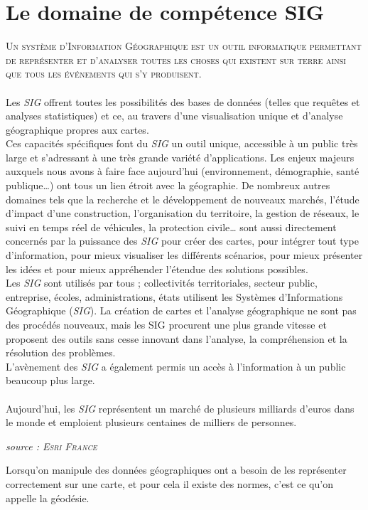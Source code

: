 \section{Le domaine de compétence SIG}
\textsc{
Un système d’Information Géographique est un outil informatique permettant de représenter et d’analyser toutes les choses qui existent sur terre ainsi que tous les événements qui s’y produisent.
}\\\\
Les \textit{SIG} offrent toutes les possibilités des bases de données (telles que requêtes et analyses statistiques) et ce, au travers d’une visualisation unique et d’analyse géographique propres aux cartes.
\\Ces capacités spécifiques font du \textit{SIG} un outil unique, accessible à un public très large et s’adressant à une très grande variété d’applications.
Les enjeux majeurs auxquels nous avons à faire face aujourd’hui (environnement, démographie, santé publique…) ont tous un lien étroit avec la géographie.
De nombreux autres domaines tels que la recherche et le développement de nouveaux marchés, l’étude d’impact d’une construction, l’organisation du territoire, la gestion de réseaux, le suivi en temps réel de véhicules, la protection civile… sont aussi directement concernés par la puissance des \textit{SIG} pour créer des cartes, pour intégrer tout type d’information, pour mieux visualiser les différents scénarios, pour mieux présenter les idées et pour mieux appréhender l’étendue des solutions possibles.
\\Les \textit{SIG} sont utilisés par tous ; collectivités territoriales, secteur public, entreprise, écoles, administrations, états utilisent les Systèmes d’Informations Géographique (\textit{SIG}). La création de cartes et l’analyse géographique ne sont pas des procédés nouveaux, mais les SIG procurent une plus grande vitesse et proposent des outils sans cesse innovant dans l’analyse, la compréhension et la résolution des problèmes.
\\L’avènement des \textit{SIG} a également permis un accès à l’information à un public beaucoup plus large.
\\\\
Aujourd’hui, les \textit{SIG} représentent un marché de plusieurs milliards d'euros dans le monde et emploient plusieurs centaines de milliers de personnes.
\begin{flushright}
\textit{source : \textsc{Esri France}}
\end{flushright}
\newpage
Lorsqu'on manipule des données géographiques ont a besoin de les représenter correctement sur une carte, et pour cela il existe des normes, c'est ce qu'on appelle la géodésie.

